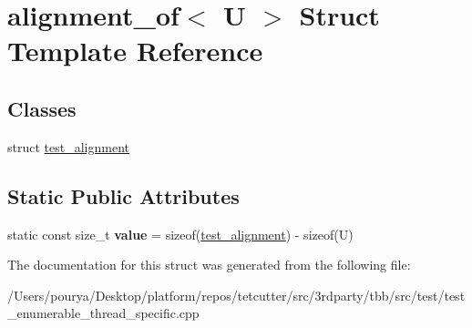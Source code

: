 \hypertarget{structalignment__of}{}\section{alignment\+\_\+of$<$ U $>$ Struct Template Reference}
\label{structalignment__of}
\subsection*{Classes}
\begin{DoxyCompactItemize}
\item 
struct \hyperlink{structalignment__of_1_1test__alignment}{test\+\_\+alignment}
\end{DoxyCompactItemize}
\subsection*{Static Public Attributes}
\begin{DoxyCompactItemize}
\item 
\hypertarget{structalignment__of_a37bc9ea317b3c3ee4362b4523098fef8}{}static const size\+\_\+t {\bfseries value} = sizeof(\hyperlink{structalignment__of_1_1test__alignment}{test\+\_\+alignment}) -\/ sizeof(U)\label{structalignment__of_a37bc9ea317b3c3ee4362b4523098fef8}

\end{DoxyCompactItemize}


The documentation for this struct was generated from the following file\+:\begin{DoxyCompactItemize}
\item 
/\+Users/pourya/\+Desktop/platform/repos/tetcutter/src/3rdparty/tbb/src/test/test\+\_\+enumerable\+\_\+thread\+\_\+specific.\+cpp\end{DoxyCompactItemize}
